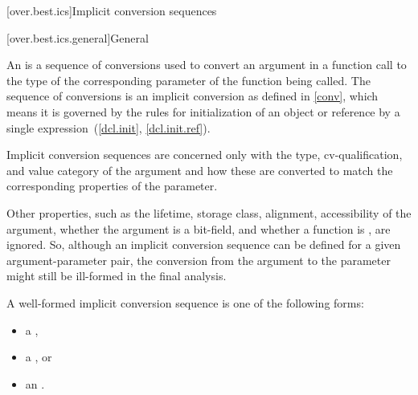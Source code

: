 [over.best.ics]{Implicit conversion sequences}%

[over.best.ics.general]{General}%

\pnum
An 
is a sequence of conversions used
to convert an argument in a function call to the type of the
corresponding parameter of the function being called.
The
sequence of conversions is an implicit conversion as defined in
\ref{conv}, which means it is governed by the rules for
initialization of an object or reference by a single
expression~(\ref{dcl.init}, \ref{dcl.init.ref}).

\pnum
Implicit conversion sequences are concerned only with the type,
cv-qualification, and value category of the argument and how these
are converted to match the corresponding properties of the
parameter.
\begin{note}
Other properties, such as the lifetime, storage class,
alignment, accessibility of the argument, whether the argument is a bit-field,
and whether a function is , are ignored.
So, although an implicit
conversion sequence can be defined for a given argument-parameter
pair, the conversion from the argument to the parameter might still
be ill-formed in the final analysis.
\end{note}

\pnum
A
well-formed implicit conversion
sequence is one of the following forms:
\begin{itemize}
\item
a ,
\item
a , or
\item
an .
\end{itemize}

